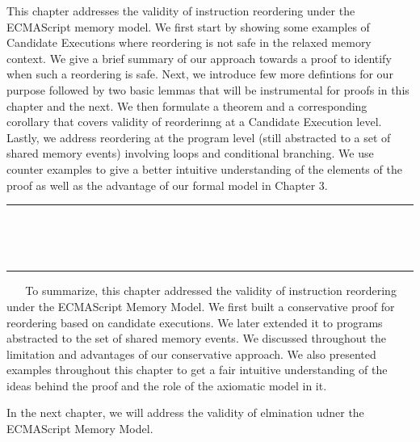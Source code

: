This chapter addresses the validity of instruction reordering under the ECMAScript memory model.
We first start by showing some examples of Candidate Executions where reordering is not safe in the relaxed memory context.  
We give a brief summary of our approach towards a proof to identify when such a reordering is safe.
Next, we introduce few more defintions for our purpose followed by two basic lemmas that will be instrumental for proofs in this chapter and the next. 
We then formulate a theorem and a corresponding corollary that covers validity of reorderinng at a Candidate Execution level. 
Lastly, we address reordering at the program level (still abstracted to a set of shared memory events) involving loops and conditional branching.
We use counter examples to give a better intuitive understanding of the elements of the proof as well as the advantage of our formal model in Chapter 3.
\ \newline
\ \newline  
\hrule 
\ \newline 
\ \newline 













\ \newline
\ \newline  
\hrule 
\ \newline 
\ \newline 
To summarize, this chapter addressed the validity of instruction reordering under the ECMAScript Memory Model. 
We first built a conservative proof for reordering based on candidate executions.
We later extended it to programs abstracted to the set of shared memory events. 
We discussed throughout the limitation and advantages of our conservative approach. 
We also presented examples throughout this chapter to get a fair intuitive understanding of the ideas behind the proof and the role of the axiomatic model in it.

In the next chapter, we will address the validity of elmination udner the ECMAScript Memory Model.